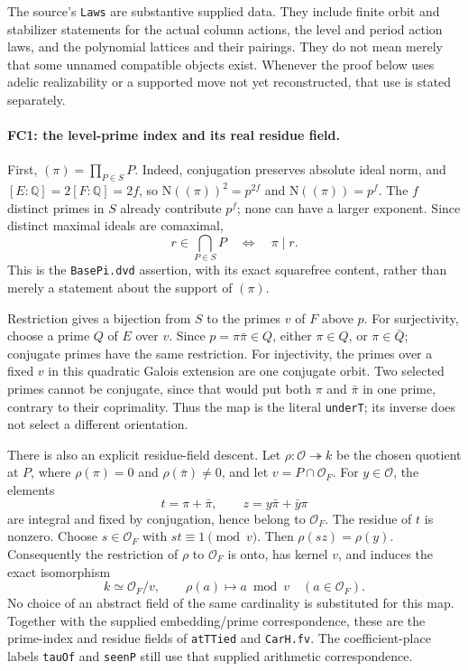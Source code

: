 \documentclass[11pt,a4paper]{article}
\numberwithin{equation}{section}
\theoremstyle{remark}\newtheorem{remark}[theorem]{Remark}
\begin{document}
The source's \texttt{Laws} are substantive supplied data. They include
finite orbit and stabilizer statements for the actual column actions,
the level and period action laws, and the polynomial lattices and their
pairings. They do not mean merely that some unnamed compatible objects
exist. Whenever the proof below uses adelic realizability or a supported
move not yet reconstructed, that use is stated separately.

\paragraph{FC1: the level-prime index and its real residue field.}
First, $(\pi)=\prod_{P\in S}P$. Indeed, conjugation preserves absolute
ideal norm, and $[E:\mathbb Q]=2[F:\mathbb Q]=2f$, so
$\mathrm N((\pi))^2=p^{2f}$ and $\mathrm N((\pi))=p^f$.
The $f$ distinct primes in $S$ already contribute $p^f$; none can have
a larger exponent. Since distinct maximal ideals are comaximal,
\[
 r\in\bigcap_{P\in S}P\quad\Longleftrightarrow\quad\pi\mid r.
 \tag{FC.1}
\]
This is the \texttt{BasePi.dvd} assertion, with its exact squarefree
content, rather than merely a statement about the support of $(\pi)$.

Restriction gives a bijection from $S$ to the primes $v$ of $F$ above
$p$. For surjectivity, choose a prime $Q$ of $E$ over $v$. Since
$p=\pi\bar\pi\in Q$, either $\pi\in Q$, or
$\pi\in\bar Q$; conjugate primes have the same restriction. For
injectivity, the primes over a fixed $v$ in this quadratic Galois
extension are one conjugate orbit. Two selected primes cannot be
conjugate, since that would put both $\pi$ and $\bar\pi$ in one
prime, contrary to their coprimality. Thus the map is the literal
\texttt{underT}; its inverse does not select a different orientation.

There is also an explicit residue-field descent. Let
$\rho:\mathcal O\twoheadrightarrow k$ be the chosen quotient at $P$,
where $\rho(\pi)=0$ and $\rho(\bar\pi)\ne0$, and let
$v=P\cap\mathcal O_F$. For $y\in\mathcal O$, the elements
\[
 t=\pi+\bar\pi,\qquad z=y\bar\pi+\bar y\pi
 \tag{FC.2}
\]
are integral and fixed by conjugation, hence belong to $\mathcal O_F$.
The residue of $t$ is nonzero. Choose $s\in\mathcal O_F$ with
$st\equiv1\pmod v$. Then $\rho(sz)=\rho(y)$. Consequently the
restriction of $\rho$ to $\mathcal O_F$ is onto, has kernel $v$, and
induces the exact isomorphism
\[
 k\simeq\mathcal O_F/v,
 \qquad \rho(a)\longmapsto a\bmod v\quad(a\in\mathcal O_F).
 \tag{FC.3}
\]
No choice of an abstract field of the same cardinality is substituted
for this map. Together with the supplied embedding/prime correspondence,
these are the prime-index and residue fields of \texttt{atTTied} and
\texttt{CarH.fv}. The coefficient-place labels \texttt{tauOf} and
\texttt{seenP} still use that supplied arithmetic correspondence.
\end{document}
